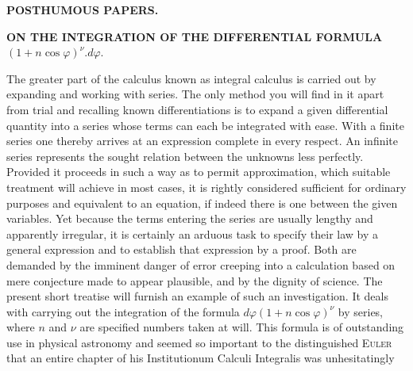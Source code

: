 
\begin{center}
\textbf{POSTHUMOUS PAPERS.}
\end{center}

\begin{center}
\textbf{ON THE INTEGRATION OF THE DIFFERENTIAL FORMULA}\\
$(1+n\cos\varphi)^{\nu}. d\varphi.$
\end{center}

\noindent\hspace*{\parindent} The greater part of the calculus known as integral calculus is carried out by expanding and working with series. The only method you will find in it apart from trial and recalling known differentiations is to expand a given differential quantity into a series whose terms can each be integrated with ease. With a finite series one thereby arrives at an expression complete in every respect. An infinite series represents the sought relation between the unknowns less perfectly. Provided it proceeds in such a way as to permit approximation, which suitable treatment will achieve in most cases, it is rightly considered sufficient for ordinary purposes and equivalent to an equation, if indeed there is one between the given variables. Yet because the terms entering the series are usually lengthy and apparently irregular, it is certainly an arduous task to specify their law by a general expression and to establish that expression by a proof. Both are demanded by the imminent danger of error creeping into a calculation based on mere conjecture made to appear plausible, and by the dignity of science. The present short treatise will furnish an example of such an investigation. It deals with carrying out the integration of the formula $d\varphi(1+n\cos\varphi)^{\nu}$ by series, where $n$ and $\nu$ are specified numbers taken at will. This formula is of outstanding use in physical astronomy and seemed so important to the distinguished \textsc{Euler} that an entire chapter of his Institutionum Calculi Integralis was unhesitatingly%
